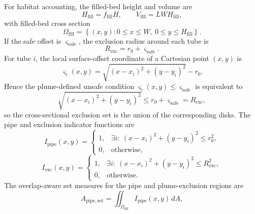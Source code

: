 \documentclass[11pt]{article}
\begin{document}
For habitat accounting, the filled-bed height and volume are
\begin{equation}
\label{eq:fill_height}
H_{\mathrm{fill}}=f_{\mathrm{fill}}H,
\qquad
V_{\mathrm{fill}}=LWH_{\mathrm{fill}},
\end{equation}
with filled-bed cross section
\begin{equation}
\label{eq:filled_domain}
\Omega_{\mathrm{fill}}=\left\{(x,y):0\le x\le W,\ 0\le y\le H_{\mathrm{fill}}\right\}.
\end{equation}
If the safe offset is \(\varsigma_{\mathrm{safe}}\), the exclusion radius around each tube is
\begin{equation}
\label{eq:exclusion_radius}
R_{\mathrm{exc}}=r_0+\varsigma_{\mathrm{safe}}.
\end{equation}
For tube \(i\), the local surface-offset coordinate of a Cartesian point \((x,y)\) is
\begin{equation}
\label{eq:local_sigma_from_cartesian}
\varsigma_i(x,y)=\sqrt{(x-x_i)^2+(y-y_i)^2}-r_0.
\end{equation}
Hence the plume-defined unsafe condition \(\varsigma_i(x,y)\le \varsigma_{\mathrm{safe}}\) is equivalent to
\begin{equation}
\label{eq:sigma_safe_cartesian_equivalence}
\sqrt{(x-x_i)^2+(y-y_i)^2}\le r_0+\varsigma_{\mathrm{safe}}=R_{\mathrm{exc}},
\end{equation}
so the cross-sectional exclusion set is the union of the corresponding disks. The pipe and exclusion indicator functions are
\begin{equation}
\label{eq:pipe_indicator}
I_{\mathrm{pipe}}(x,y)=
\begin{cases}
1, & \exists i:\ (x-x_i)^2+(y-y_i)^2\le r_0^2,\\
0, & \text{otherwise},
\end{cases}
\end{equation}
\begin{equation}
\label{eq:exclusion_indicator}
I_{\mathrm{exc}}(x,y)=
\begin{cases}
1, & \exists i:\ (x-x_i)^2+(y-y_i)^2\le R_{\mathrm{exc}}^2,\\
0, & \text{otherwise}.
\end{cases}
\end{equation}
The overlap-aware set measures for the pipe and plume-exclusion regions are
\begin{equation}
\label{eq:pipe_set_area}
A_{\mathrm{pipe,set}}=\iint_{\Omega_{\mathrm{fill}}} I_{\mathrm{pipe}}(x,y)\,dA,
\end{equation}
\end{document}
